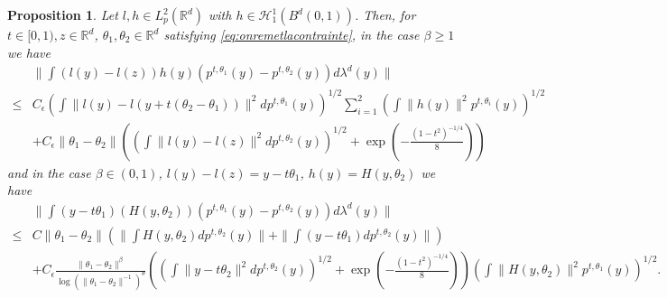 \documentclass{article}
\newtheorem{proposition}{Proposition}
\begin{document}
\begin{proposition}\label{prop:lipptx3}
Let $l,h\in L^2_p(\mathbb{R}^d)$ with
$h \in \mathcal{H}_{1}^{1}(B^d(0,1))$.
Then, for $t\in [0,1),z\in \mathbb{R}^d$, $\theta_1,\theta_2\in \mathbb{R}^d$ satisfying \eqref{eq:onremetlacontrainte}, in the case $\beta\geq 1$ we have 
    \begin{align*}
        &\|\int (l(y)-l(z))h(y)(p^{t,\theta_1}(y)-p^{t,\theta_2}(y))d\lambda^d(y)\|\\
         \leq &C_\epsilon \left(\int\|l(y)-l(y+t(\theta_2-\theta_1))\|^2dp^{t,\theta_1}(y)\right)^{1/2}\sum_{i=1}^2\left(\int\|h(y)\|^2p^{t,\theta_i}(y) \right)^{1/2}\\
        & +C_\epsilon\|\theta_1-\theta_2\|\left(\left(\int\|l(y)-l(z)\|^2dp^{t,\theta_2}(y) \right)^{1/2}+\exp(-\frac{(1-t^2)^{-1/4}}{8})\right)
    \end{align*}
    and in the case $\beta\in (0,1)$, $l(y)-l(z)=y-t\theta_1$, $h(y)=H(y,\theta_2)$ we have
    \begin{align*}
        &\|\int (y-t\theta_1)\left(H(y,\theta_2)\right)(p^{t,\theta_1}(y)-p^{t,\theta_2}(y))d\lambda^d(y)\|\\
         \leq &C\|\theta_1-\theta_2\|\left(\|\int H(y,\theta_2)dp^{t,\theta_2}(y) \|+\|\int \left(y-t\theta_1 \right)dp^{t,\theta_2}(y)\|\right)\\
        & +C_\epsilon\frac{\|\theta_1-\theta_2\|^{\beta}}{\log(\|\theta_1-\theta_2\|^{-1})^{\theta}}\left(\left(\int\|y-t\theta_2\|^2dp^{t,\theta_2}(y) \right)^{1/2}+\exp(-\frac{(1-t^2)^{-1/4}}{8})\right)\left(\int\|H(y,\theta_2)\|^2p^{t,\theta_1}(y) \right)^{1/2}.
    \end{align*}
\end{proposition}
\end{document}
